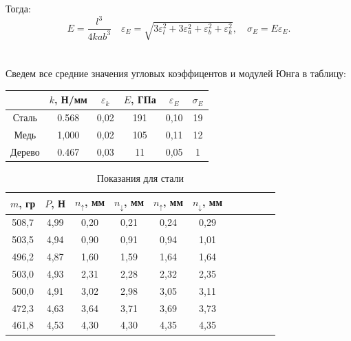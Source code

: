 \documentclass[a4paper]{article}
\begin{document}
\noindent Тогда:
\[
E = \frac{l^3}{4kab^3} \quad \varepsilon_E = \sqrt{3\varepsilon_l^2 + 3\varepsilon_a^2 + \varepsilon_b^2 + \varepsilon_k^2}, \quad \sigma_E = E\varepsilon_E.
\] \\ \\
Сведем все средние значения угловых коэффицентов и модулей Юнга в таблицу:
\begin{table}[!h]
\centering
\begin{tabular}{|c|c|c|c|c|c|}
\hline
& $k$, Н/мм & $\varepsilon_k$ & $E$, ГПа & $\varepsilon_E $ & $\sigma_E$\\
\hline
Сталь & 0.568 & 0,02 & 191 & 0,10 & 19\\
\hline
Медь & 1,000 & 0,02 & 105 & 0,11 & 12 \\
\hline
Дерево & 0.467 & 0,03 & 11 & 0,05 & 1\\
\hline
\end{tabular}
\end{table}

\newpage
\begin{table}[!h]
\caption{Показания для стали} 
\centering
\begin{tabular}{|c|c|c|c|c|c|c|c|c|c|c|}
\hline
$m$, гр & $P$, Н & $n_\uparrow$, мм &$n_\downarrow$, мм & $n_\uparrow$, мм &$n_\downarrow$, мм \\
\hline
508,7&4,99&	0,20&	0,21&	0,24&	0,29\\
503,5&4,94&	0,90&	0,91&	0,94&	1,01\\
496,2&4,87&	1,60&	1,59&	1,64&	1,64\\
503,0&4,93&	2,31&	2,28&	2,32&	2,35\\
500,0&4,91&	3,02&	2,98&	3,05&	3,11\\
472,3&4,63&	3,64&	3,71&	3,69&	3,73\\
461,8&4,53&	4,30&	4,30&	4,35&	4,35\\
\hline
\end{tabular}
\end{table}
\end{document}
